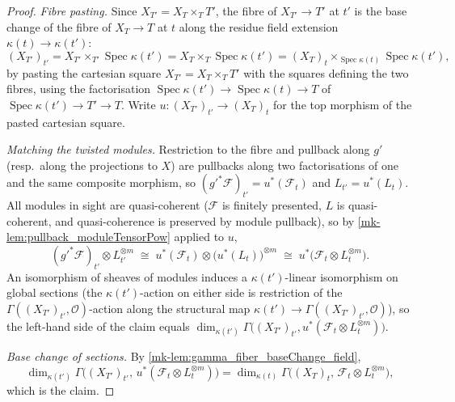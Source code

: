 \begin{proof}
  \emph{Fibre pasting.}  Since \(X_{T'} = X_T \times_T T'\), the fibre of
  \(X_{T'} \to T'\) at \(t'\) is the base change of the fibre of
  \(X_T \to T\) at \(t\) along the residue field extension
  \(\kappa(t) \to \kappa(t')\):
  \[
    (X_{T'})_{t'}
    = X_{T'} \times_{T'} \operatorname{Spec} \kappa(t')
    = X_T \times_T \operatorname{Spec} \kappa(t')
    = (X_T)_t \times_{\operatorname{Spec} \kappa(t)}
      \operatorname{Spec} \kappa(t'),
  \]
  by pasting the cartesian square \(X_{T'} = X_T \times_T T'\) with the
  squares defining the two fibres, using the factorisation
  \(\operatorname{Spec}\kappa(t') \to \operatorname{Spec}\kappa(t) \to T\)
  of \(\operatorname{Spec}\kappa(t') \to T' \to T\).  Write
  \(u : (X_{T'})_{t'} \to (X_T)_t\) for the top morphism of the pasted
  cartesian square.

  \emph{Matching the twisted modules.}  Restriction to the fibre and
  pullback along \(g'\) (resp.\ along the projections to \(X\)) are
  pullbacks along two factorisations of one and the same composite
  morphism, so \((g'^*\mathcal{F})_{t'} = u^* (\mathcal{F}_t)\) and
  \(L_{t'} = u^* (L_t)\).  All modules in sight are quasi-coherent
  (\(\mathcal{F}\) is finitely presented, \(L\) is quasi-coherent, and
  quasi-coherence is preserved by module pullback), so by
  \ref{mk-lem:pullback_moduleTensorPow} applied to \(u\),
  \[
    (g'^*\mathcal{F})_{t'} \otimes L_{t'}^{\otimes m}
    \;\cong\;
    u^*(\mathcal{F}_t) \otimes \bigl(u^* (L_t)\bigr)^{\otimes m}
    \;\cong\;
    u^*\bigl(\mathcal{F}_t \otimes L_t^{\otimes m}\bigr).
  \]
  An isomorphism of sheaves of modules induces a \(\kappa(t')\)-linear
  isomorphism on global sections (the \(\kappa(t')\)-action on either side
  is restriction of the \(\Gamma((X_{T'})_{t'}, \mathcal{O})\)-action along
  the structural map \(\kappa(t') \to \Gamma((X_{T'})_{t'}, \mathcal{O})\)),
  so the left-hand side of the claim equals
  \(\dim_{\kappa(t')} \Gamma\bigl((X_{T'})_{t'},
  u^*(\mathcal{F}_t \otimes L_t^{\otimes m})\bigr)\).

  \emph{Base change of sections.}  By
  \ref{mk-lem:gamma_fiber_baseChange_field},
  \[
    \dim_{\kappa(t')} \Gamma\bigl((X_{T'})_{t'},\,
      u^*(\mathcal{F}_t \otimes L_t^{\otimes m})\bigr)
    =
    \dim_{\kappa(t)} \Gamma\bigl((X_T)_t,\,
      \mathcal{F}_t \otimes L_t^{\otimes m}\bigr),
  \]
  which is the claim.
\end{proof}

